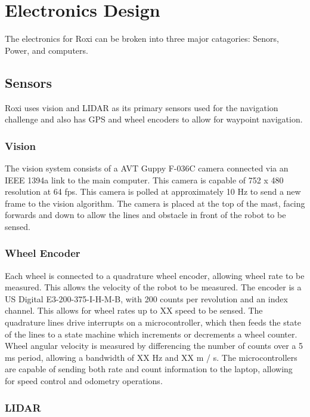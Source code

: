 \section{Electronics Design}

The electronics for Roxi can be broken into three major catagories: Senors, Power, and computers.

\subsection{Sensors}

Roxi uses vision and LIDAR as its primary sensors used for the navigation challenge and also has GPS and wheel encoders to allow for waypoint navigation.

\subsubsection{Vision}

The vision system consists of a AVT Guppy F-036C camera connected via an IEEE 1394a link to the main computer. This camera is capable of 752 x 480 resolution at 64 fps. This camera is polled at approximately 10 Hz to send a new frame to the vision algorithm.  The camera is placed at the top of the mast, facing forwards and down to allow the lines and obstacle in front of the robot to be sensed.

\subsubsection{Wheel Encoder}

Each wheel is connected to a quadrature wheel encoder, allowing wheel rate to be measured. This allows the velocity of the robot to be measured. The encoder is a US Digital E3-200-375-I-H-M-B, with 200 counts per revolution and an index channel. This allows for wheel rates up to XX speed to be sensed. The quadrature lines drive interrupts on a microcontroller, which then feeds the state of the lines to a state machine which increments or decrements a wheel counter. Wheel angular velocity is measured by differencing the number of counts over a 5 ms period, allowing a bandwidth of XX Hz and XX m / s. The microcontrollers are capable of sending both rate and count information to the laptop, allowing for speed control and odometry operations.

\subsubsection{LIDAR}


